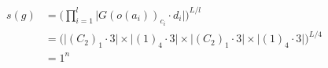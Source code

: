 \documentclass[preview]{standalone}
\begin{document}
\begin{align*}
s(g) &= \big(\prod_{i=1}^{l}\big|G(o(a_i))_{c_i}\cdot d_i\big|\big)^{L/l} \\   &= \big(\big|(C_2)_1\cdot 3\big| \times \big|(1)_4\cdot 3\big|\times \big|(C_2)_1\cdot 3\big| \times \big|(1)_4\cdot 3\big|)^{L/4} \\   &= 1^{n}
\end{align*}
\end{document}
